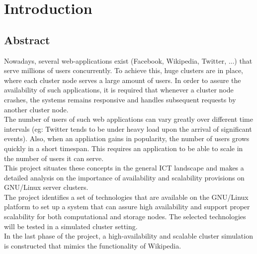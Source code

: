 \documentclass[12pt]{report}
\begin{document}
\newcommand{\treeroot}[1]{%
\node[above] at (0,0) {#1};%
\setcounter{treeline}{0}
}

\newcommand{\treeentry}[2]{%
\draw[->] (#2-1,-\value{treeline}/2) -- (#2-1,-\value{treeline}/2-0.5) -- (#2+0.5,-\value{treeline}/2-0.5) node[right] {#1};
\stepcounter{treeline}
}

\newcommand{\altentry}[2]{%
\draw[->] (#2-1,-\value{treeline}/2) -- (#2-1,-\value{treeline}/2-0.5) -- (#2+0.5,-\value{treeline}/2-0.5) node[right] {#1};
\foreach \x in {1,...,#2}
{   \draw (\x-1,-\value{treeline}/2) -- (\x-1,-\value{treeline}/2-0.5);
}
\stepcounter{treeline}
}


\tableofcontents %

\newpage %

\chapter{Introduction} %
\section{Abstract}
Nowadays, several web-applications exist (Facebook, Wikipedia, Twitter, ...) that serve millions of users concurrently. To achieve this, huge clusters are in place, where each cluster node serves a large amount of users. In order to assure the availability of such applications, it is required that whenever a cluster node crashes, the systems remains responsive and handles subsequent requests by another cluster node.\\
The number of users of such web applications can vary greatly over different time intervals (eg: Twitter tends to be under heavy load upon the arrival of significant events). Also, when an appliation gains in popularity, the number of users grows quickly in a short timespan. This requires an application to be able to scale in the number of users it can serve.\\
This project situates these concepts in the general ICT landscape and makes a detailed analysis on the importance of availability and scalability provisions on GNU/Linux server clusters.\\
The project identifies a set of technologies that are available on the GNU/Linux platform to set up a system that can assure high availability and support proper scalability for both computational and storage nodes. The selected technologies will be tested in a simulated cluster setting.\\
In the last phase of the project, a high-availability and scalable
cluster simulation is constructed that mimics the functionality of
Wikipedia.
\end{document}
